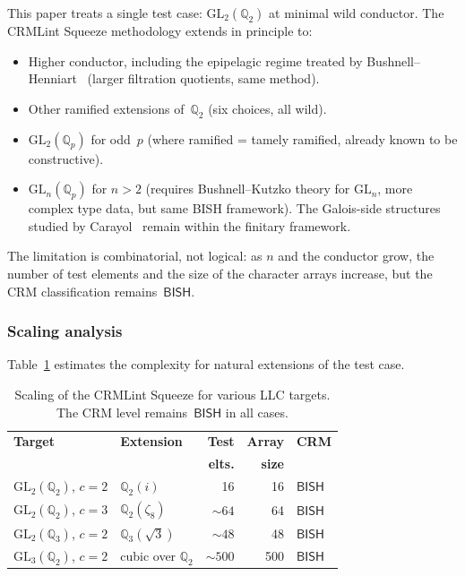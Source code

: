 \documentclass[11pt]{article}
\theoremstyle{plain}
\theoremstyle{definition}
\theoremstyle{remark}
\newcommand{\Q}{\mathbb{Q}}
\newcommand{\GL}{\mathrm{GL}}
\newcommand{\BISH}{\mathsf{BISH}}
\begin{document}
This paper treats a single test case: $\GL_2(\Q_2)$ at minimal
wild conductor.  The CRMLint Squeeze methodology extends in
principle to:
\begin{itemize}[nosep]
\item Higher conductor, including the epipelagic regime treated by
  Bushnell--Henniart~\cite{BushnellHenniart2014} (larger filtration
  quotients, same method).
\item Other ramified extensions of~$\Q_2$ (six choices, all wild).
\item $\GL_2(\Q_p)$ for odd~$p$ (where ramified = tamely ramified,
  already known to be constructive).
\item $\GL_n(\Q_p)$ for $n > 2$ (requires Bushnell--Kutzko theory
  for $\GL_n$, more complex type data, but same BISH framework).
  The Galois-side structures studied by
  Carayol~\cite{Carayol1986} remain within the finitary framework.
\end{itemize}

The limitation is combinatorial, not logical: as $n$ and the
conductor grow, the number of test elements and the size of
the character arrays increase, but the CRM classification
remains~$\BISH$.

\subsubsection*{Scaling analysis}

Table~\ref{tab:scaling} estimates the complexity for natural
extensions of the test case.

\begin{table}[ht]
\centering
\caption{Scaling of the CRMLint Squeeze for various LLC targets.
  The CRM level remains~$\BISH$ in all cases.}
\label{tab:scaling}
\begin{tabular}{llrrl}
\toprule
\textbf{Target} & \textbf{Extension} & \textbf{Test}
  & \textbf{Array} & \textbf{CRM} \\
& & \textbf{elts.} & \textbf{size} & \\
\midrule
$\GL_2(\Q_2)$, $c = 2$ & $\Q_2(i)$ & 16 & 16 & $\BISH$ \\
$\GL_2(\Q_2)$, $c = 3$ & $\Q_2(\zeta_8)$ & $\sim 64$ & 64 & $\BISH$ \\
$\GL_2(\Q_3)$, $c = 2$ & $\Q_3(\sqrt{3})$ & $\sim 48$ & 48 & $\BISH$ \\
$\GL_3(\Q_2)$, $c = 2$ & cubic over $\Q_2$ & $\sim 500$ & 500 & $\BISH$ \\
\bottomrule
\end{tabular}
\end{table}
\end{document}
